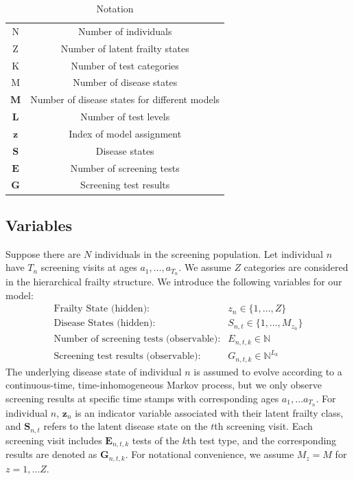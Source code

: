 \documentclass{article}
\begin{document}
\begin{table}
	
	\caption{Notation}
	\label{notation}
	\centering
	\begin{tabular}{cc}
		\hline
		N & Number of individuals \\
		Z & Number of latent frailty states \\
		K & Number of test categories \\
		M & Number of disease states\\
		$\bm M$ & Number of disease states for different models  \\
		$\bm L$ & Number of test levels \\
		$\bm z$ & Index of model assignment \\
		$\bm S$ & Disease states \\
		$\bm E$ & Number of screening tests \\
		$\bm G$ & Screening test results \\
		\hline
	\end{tabular}
\end{table}

\subsection{Variables}

Suppose there are $N$ individuals in the screening population.  Let individual $n$ have $T_n$ screening visits at ages $a_1, \ldots, a_{T_n}$. We assume $Z$ categories are considered in the hierarchical frailty structure. We introduce the following variables for our model:
\begin{eqnarray}
\textrm{Frailty State (hidden):} & z_{n} \in \{1, \ldots, Z\} \nonumber \\
\textrm{Disease States (hidden):} & S_{n, t} \in \{1, \ldots, M_{z_n}\} \nonumber \\
\textrm{Number of screening tests (observable):} & E_{n, t, k} \in \mathbb{N} \nonumber \\
\textrm{Screening test results (observable):} & G_{n,t,k} \in \mathbb{N}^{L_k} \nonumber 
\end{eqnarray}
The underlying disease state of individual $n$ is assumed to evolve according to a continuous-time, time-inhomogeneous Markov process, but we only observe screening results at specific time stamps with corresponding ages $a_1, \ldots a_{T_n}$. For individual $n$, $\bm z_n$ is an indicator variable  associated with their latent frailty class, and $\bm S_{n,t}$ refers to the latent disease state on the $t$th screening visit. Each screening visit includes $\bm E_{n,t,k}$ tests of the $k$th test type, and the corresponding results are denoted as $\bm G_{n,t,k}$. For notational convenience, we assume $M_z = M$ for $z = 1, \ldots Z$.
\end{document}
